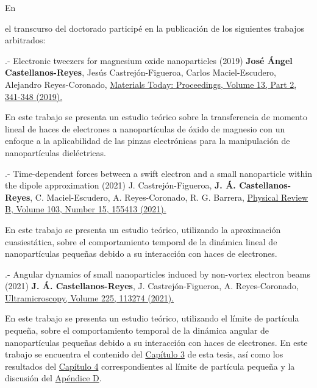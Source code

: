 \hypertarget{listadepublicaciones}{En} el transcurso del doctorado participé en la publicación de los siguientes trabajos arbitrados:
\vspace{0.5cm}

%
%
\begin{mybox2}{.- Electronic tweezers for magnesium oxide nanoparticles (2019)}
	\textbf{Jos\'e \'Angel Castellanos-Reyes}, Jes\'us Castrej\'on-Figueroa, Carlos Maciel-Escudero, Alejandro Reyes-Coronado,
	\href{https://doi.org/10.1016/j.matpr.2019.03.163}{Materials Today: Proceedings,
		Volume 13,
		Part 2, 
		341-348 
		(2019).}
\end{mybox2}{}
%
En este trabajo se presenta un estudio teórico sobre la transferencia de momento lineal de haces de electrones a nanopartículas de óxido de magnesio con un enfoque a la aplicabilidad de las pinzas electrónicas para la manipulación de nanopartículas dieléctricas.
\vspace{0.5cm}

%
%
\begin{mybox2}{.- Time-dependent forces between a swift electron and a small nanoparticle within the dipole approximation (2021)}
J. Castrejón-Figueroa, \textbf{J. Á. Castellanos-Reyes}, C. Maciel-Escudero, A. Reyes-Coronado, R. G. Barrera,
\href{https://doi.org/10.1103/PhysRevB.103.155413}{Physical Review B, Volume 103, Number 15, 155413 (2021).}
\end{mybox2}{}
%
En este trabajo se presenta un estudio teórico, utilizando la aproximación cuasiestática, sobre el comportamiento temporal de la dinámica lineal de nanopartículas pequeñas debido a su interacción con haces de electrones. 
\vspace{0.5cm}

%
%
\begin{mybox2}{.- Angular dynamics of small nanoparticles induced by non-vortex electron beams (2021)}
	\textbf{J. Á. Castellanos-Reyes}, J. Castrejón-Figueroa, A. Reyes-Coronado,
	\href{https://doi.org/10.1016/j.ultramic.2021.113274}{Ultramicroscopy,
		Volume 225,
		113274
		(2021).}
\end{mybox2}{}
%
En este trabajo se presenta un estudio teórico, utilizando el límite de partícula pequeña, sobre el comportamiento temporal de la dinámica angular de nanopartículas pequeñas debido a su interacción con haces de electrones. En este trabajo se encuentra el contenido del \hyperlink{nanoparticulaspequeñas}{Capítulo 3} de esta tesis, así como los resultados del \hyperlink{resultadosydiscusion}{Capítulo 4} correspondientes al límite de partícula pequeña y la discusión del \hyperlink{AppendixGdA}{Apéndice D}.
\vspace{0.5cm}

